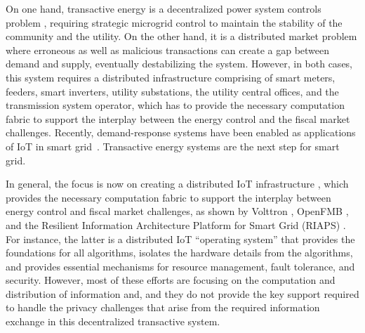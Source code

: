 On one hand, transactive energy is a decentralized power system controls problem \cite{7452738}, requiring strategic microgrid control to maintain the stability of the community and the utility. On the other hand, it is a distributed market problem where erroneous as well as malicious transactions can create a gap between demand and supply, eventually destabilizing the system. However, in both cases, this system requires a distributed  infrastructure comprising of smart meters, feeders, smart inverters, utility substations, the utility central offices, and the transmission system operator, which has to provide the necessary computation fabric to support the interplay between the energy control and the fiscal market challenges. 
Recently, demand-response systems have been enabled as applications of IoT in smart grid~\cite{Haider2016166}. Transactive energy systems are the next step for smart grid.

In general, the focus is now on creating a distributed IoT infrastructure%
, which provides the necessary computation fabric to support the interplay between energy control and fiscal market challenges, as shown by Volttron \cite{katipamula2016volttron},  OpenFMB \cite{gunthersmart}, and the Resilient Information Architecture Platform for Smart Grid (RIAPS) \cite{eisele2017riaps,Scott2017ICCPS}. For instance, the latter is a distributed IoT  ``operating system'' that provides the foundations for all algorithms, isolates the hardware details from the algorithms, and provides essential mechanisms for resource management, fault tolerance, and security. However, most of these efforts are focusing on the computation and distribution of information and, and they do not provide the key support required to handle the privacy challenges that arise from the required information exchange in this decentralized transactive system. 


